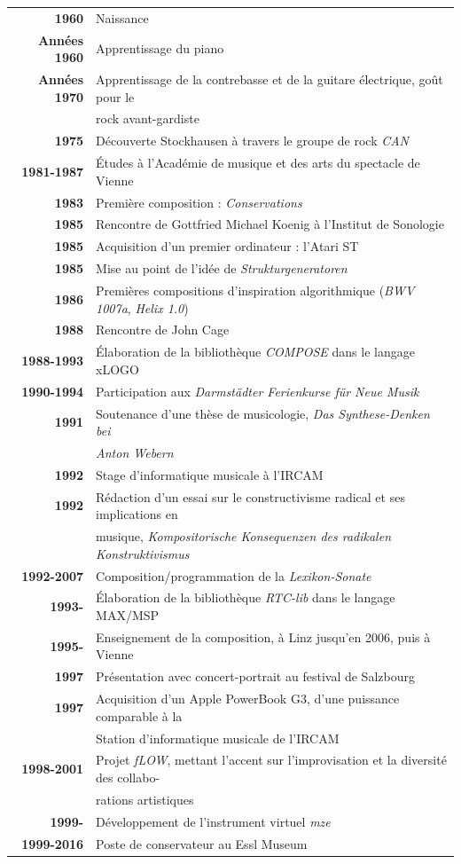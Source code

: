 \documentclass[a4paper,12pt]{article}
\newcommand{\maze}[0]{\emph{m\symbol{64}ze\textdegree2}}
\begin{document}
\begin{tabular}{rl}
\textbf{1960} & Naissance \\
\textbf{Années 1960} & Apprentissage du piano \\
\textbf{Années 1970} & Apprentissage de la contrebasse et de la guitare électrique, goût pour le \\ & rock avant-gardiste \\
\textbf{1975} & Découverte Stockhausen à travers le groupe de rock \emph{CAN} \\
\textbf{1981-1987} & Études à l'Académie de musique et des arts du spectacle de Vienne \\
\textbf{1983} & Première composition : \emph{Conservations} \\
\textbf{1985} & Rencontre de Gottfried Michael Koenig à l'Institut de Sonologie \\
\textbf{1985} & Acquisition d'un premier ordinateur : l'Atari ST \\
\textbf{1985} & Mise au point de l'idée de \emph{Strukturgeneratoren} \\
\textbf{1986} & Premières compositions d'inspiration algorithmique (\emph{BWV 1007a}, \emph{Helix 1.0}) \\
\textbf{1988} & Rencontre de John Cage \\
\textbf{1988-1993} & Élaboration de la bibliothèque \emph{COMPOSE} dans le langage xLOGO \\
\textbf{1990-1994} & Participation aux \emph{Darmstädter Ferienkurse für Neue Musik} \\
\textbf{1991} & Soutenance d'une thèse de musicologie, \emph{Das Synthese-Denken bei} \\ & \emph{Anton Webern} \\
\textbf{1992} & Stage d'informatique musicale à l'IRCAM \\
\textbf{1992} & Rédaction d'un essai sur le constructivisme radical et ses implications en \\ & musique, \emph{Kompositorische Konsequenzen des radikalen Konstruktivismus} \\
\textbf{1992-2007} & Composition/programmation de la \emph{Lexikon-Sonate} \\
\textbf{1993-} & Élaboration de la bibliothèque \emph{RTC-lib} dans le langage MAX/MSP \\
\textbf{1995-} & Enseignement de la composition, à Linz jusqu'en 2006, puis à Vienne \\
\textbf{1997} & Présentation avec concert-portrait au festival de Salzbourg \\
\textbf{1997} & Acquisition d'un Apple PowerBook G3, d'une puissance comparable à la \\ & Station d'informatique musicale de l'IRCAM \\
\textbf{1998-2001} & Projet \emph{fLOW}, mettant l'accent sur l'improvisation et la diversité des collabo- \\ & rations artistiques \\
\textbf{1999-} & Développement de l'instrument virtuel \maze \\
\textbf{1999-2016} & Poste de conservateur au Essl Museum
\end{tabular}
\end{document}
